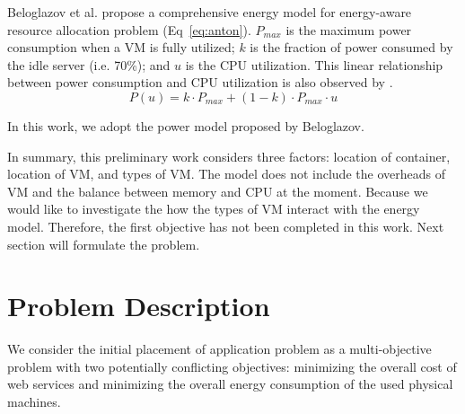 Beloglazov et al. \cite{Beloglazov:2012ji} propose a comprehensive energy model for energy-aware resource allocation problem (Eq~\ref{eq:anton}). $P_{max}$ is the maximum power consumption when a VM is fully utilized;
$k$ is the fraction of power consumed by the idle server (i.e. 70\%); and $u$ is the CPU utilization. This linear relationship between power consumption and CPU utilization is also observed by \cite{Energy_4, Energy_5}. 
\begin{equation}
\label{eq:anton}
  P(u) = k \cdot P_{max} + (1 - k) \cdot P_{max} \cdot u
\end{equation}

In this work, we adopt the power model proposed by Beloglazov. 

In summary, this preliminary work considers three factors: location of container, location of VM, and types of VM. The model does not include the overheads of VM and the balance between memory and CPU at the moment. Because we would like to investigate the how the types of VM interact with the energy model. Therefore, the first objective has not been completed in this work. Next section will formulate the problem.



\section{Problem Description}
\label{sec:problem}
We consider the initial placement of application problem as a multi-objective problem with two potentially conflicting objectives: 
minimizing the overall cost of web services and minimizing the overall energy consumption of the used physical machines. 

